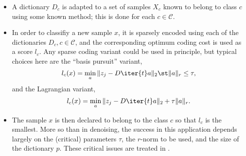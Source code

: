 \documentclass[a4paper,11pt]{article}
\begin{document}
\begin{itemize}
\item A  dictionary $D_c$ is adapted to a set of samples $X_c$ known to belong to class $c$ using some known method; this is done for each $c \in \mathcal{C}$. 
\item In order  to classifiy a new sample $x$, it is sparsely encoded using each of the dictionaries $D_c, c \in \mathcal{C}$, and the corresponding optimum coding cost is used as a score $l_c$. Any sparse coding variant could be used in principle, but typical choices here are the ``basis pursuit'' variant,
\[
l_c(x) = \min_a \|z_j - D\iter{t}a \|_2 \st  \|a\|_r \leq \tau, 
\]
and the Lagrangian variant,
\[
l_c(x) = \min_a \|z_j - D\iter{t}a \|_2 + \tau  \|a\|_r. 
\]
\item The sample $x$ is then declared to belong to the class $c$ so that  $l_c$ is the smallest. 
More so than in denoising, the success in this application depends largely  on the (critical) parameters $\tau$,  the $r$-norm  to be used, and the size of the dictionary $p$. These critical issues are treated in \cite{ramirez12tsp}.
\end{itemize}




\end{document}
